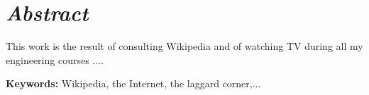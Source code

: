 
\chapter*{\emph{Abstract}}

This work is the result of consulting Wikipedia and of watching TV
during all my engineering courses ....

\textbf{\vspace{2cm}
}

\textbf{Keywords:} Wikipedia, the Internet, the laggard corner,...


